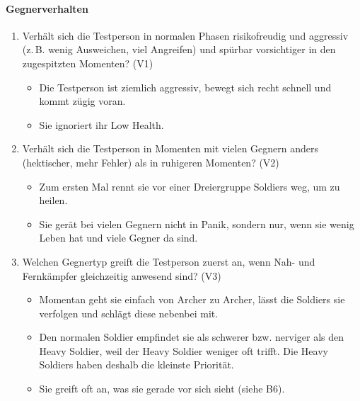 \documentclass[../Main.tex]{subfiles}
\begin{document}
\paragraph{Gegnerverhalten}
\begin{enumerate}[label=\textbf{B\arabic*}, leftmargin=1.5cm, itemsep=0.8em]
\item Verhält sich die Testperson in normalen Phasen risikofreudig und aggressiv (z.\,B. wenig Ausweichen, viel Angreifen) und spürbar vorsichtiger in den zugespitzten Momenten? \hfill (V1)
    \begin{itemize}[nosep]
        \item Die Testperson ist ziemlich aggressiv, bewegt sich recht schnell und kommt zügig voran.
        \item Sie ignoriert ihr Low Health.
    \end{itemize}

\item Verhält sich die Testperson in Momenten mit vielen Gegnern anders (hektischer, mehr Fehler) als in ruhigeren Momenten? \hfill (V2)
    \begin{itemize}[nosep]
        \item Zum ersten Mal rennt sie vor einer Dreiergruppe Soldiers weg, um zu heilen.
        \item Sie gerät bei vielen Gegnern nicht in Panik, sondern nur, wenn sie wenig Leben hat und viele Gegner da sind.
    \end{itemize}

\item Welchen Gegnertyp greift die Testperson zuerst an, wenn Nah- und Fernkämpfer gleichzeitig anwesend sind? \hfill (V3)
    \begin{itemize}[nosep]
        \item Momentan geht sie einfach von Archer zu Archer, lässt die Soldiers sie verfolgen und schlägt diese nebenbei mit.
        \item Den normalen Soldier empfindet sie als schwerer bzw. nerviger als den Heavy Soldier, weil der Heavy Soldier weniger oft trifft. Die Heavy Soldiers haben deshalb die kleinste Priorität.
        \item Sie greift oft an, was sie gerade vor sich sieht (siehe B6).
    \end{itemize}


\end{enumerate}
\end{document}
